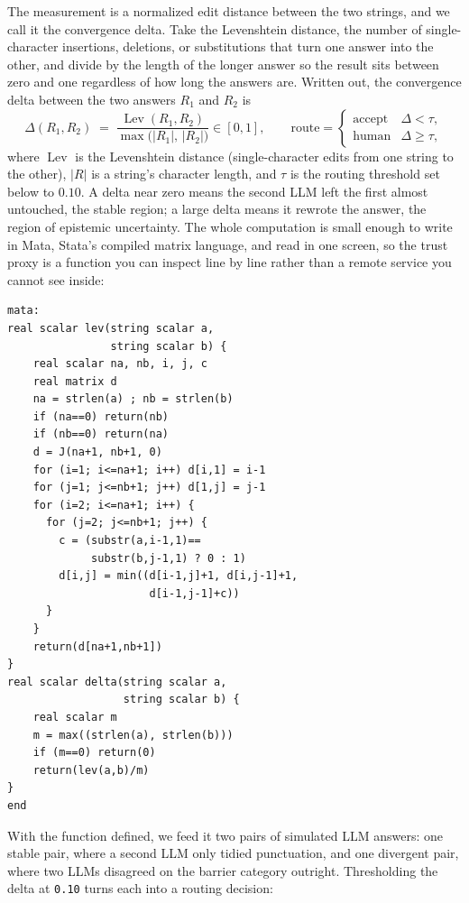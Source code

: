 \documentclass[
    a4paper,
    fontsize=10pt,
    twoside=true,
    numbers=noenddot,
]{kaobook}
\begin{document}
The measurement is a normalized edit distance between the two strings, and we call it the convergence delta. Take the Levenshtein distance, the number of single-character insertions, deletions, or substitutions that turn one answer into the other, and divide by the length of the longer answer so the result sits between zero and one regardless of how long the answers are. Written out, the convergence delta between the two answers $R_1$ and $R_2$ is
\[
\Delta(R_1,R_2)
\;=\;
\frac{\operatorname{Lev}(R_1,R_2)}{\max\!\bigl(|R_1|,\,|R_2|\bigr)}
\in [0,1],
\qquad
\text{route} =
\begin{cases}
\text{accept} & \Delta < \tau,\\[2pt]
\text{human}  & \Delta \ge \tau,
\end{cases}
\]
where $\operatorname{Lev}$ is the Levenshtein distance (single-character edits from one string to the other), $|R|$ is a string's character length, and $\tau$ is the routing threshold set below to $0.10$. A delta near zero means the second LLM left the first almost untouched, the stable region; a large delta means it rewrote the answer, the region of epistemic uncertainty. The whole computation is small enough to write in Mata, Stata's compiled matrix language, and read in one screen, so the trust proxy is a function you can inspect line by line rather than a remote service you cannot see inside:
\par
{\footnotesize
\begin{verbatim}
mata:
real scalar lev(string scalar a,
                string scalar b) {
    real scalar na, nb, i, j, c
    real matrix d
    na = strlen(a) ; nb = strlen(b)
    if (na==0) return(nb)
    if (nb==0) return(na)
    d = J(na+1, nb+1, 0)
    for (i=1; i<=na+1; i++) d[i,1] = i-1
    for (j=1; j<=nb+1; j++) d[1,j] = j-1
    for (i=2; i<=na+1; i++) {
      for (j=2; j<=nb+1; j++) {
        c = (substr(a,i-1,1)==
             substr(b,j-1,1) ? 0 : 1)
        d[i,j] = min((d[i-1,j]+1, d[i,j-1]+1,
                      d[i-1,j-1]+c))
      }
    }
    return(d[na+1,nb+1])
}
real scalar delta(string scalar a,
                  string scalar b) {
    real scalar m
    m = max((strlen(a), strlen(b)))
    if (m==0) return(0)
    return(lev(a,b)/m)
}
end
\end{verbatim}
}
With the function defined, we feed it two pairs of simulated LLM answers: one stable pair, where a second LLM only tidied punctuation, and one divergent pair, where two LLMs disagreed on the barrier category outright. Thresholding the delta at \texttt{0.10} turns each into a routing decision:
\end{document}

